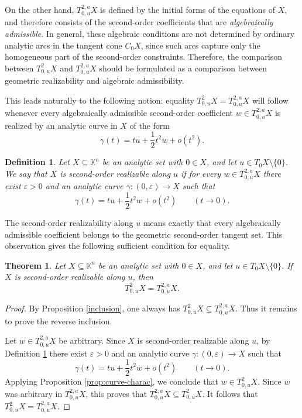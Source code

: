 \documentclass[10pt,reqno]{amsart}
\theoremstyle{break-italic}
\theoremstyle{break-italic}
\theoremstyle{break-italic}
\theoremstyle{break-italic}
\theoremstyle{break-italic}
\theoremstyle{break-italic}
\theoremstyle{break-italic}
\theoremstyle{break-italic}
\newtheorem{theorem}[satz]{Theorem}
\theoremstyle{break-roman}
\newtheorem{definition}[satz]{Definition}
\theoremstyle{standard}
\theoremstyle{varthm-roman}
\theoremstyle{varthm-italic}
\theoremstyle{varthm-roman-break}
\theoremstyle{varthm-italic-break}
\theoremstyle{varthm-roman-no-punctuation}
\theoremstyle{varthm-italic-no-punctuation}
\numberwithin{equation}{section}
\begin{document}
On the other hand, $T^{2,a}_{0,u}X$ is defined by the initial forms of the equations
of $X$, and therefore consists of the second-order coefficients that are
\emph{algebraically admissible}. In general, these algebraic conditions are not
determined by ordinary analytic arcs in the tangent cone $C_0X$, since such arcs
capture only the homogeneous part of the second-order constraints. Therefore,
the comparison between $T^2_{0,u}X$ and $T^{2,a}_{0,u}X$ should be formulated as
a comparison between geometric realizability and algebraic admissibility.

This leads naturally to the following notion: equality
\(
T^2_{0,u}X = T^{2,a}_{0,u}X
\)
will follow whenever every algebraically admissible second-order coefficient
$w\in T^{2,a}_{0,u}X$ is realized by an analytic curve in $X$ of the form
\[
\gamma(t)=tu+\frac12 t^2w+o(t^2).
\]


\begin{definition}\label{def:realizability}
Let $X\subseteq \mathbb K^n$ be an analytic set with $0\in X$, and let
$u\in T_0X\setminus\{0\}$. We say that $X$ is \emph{second-order realizable
along $u$} if for every $w\in T^{2,a}_{0,u}X$ there exist $\varepsilon>0$ and
an analytic curve
\(
\gamma:(0,\varepsilon)\to X
\)
such that
\[
\gamma(t)=tu+\frac12 t^2w+o(t^2)
\qquad (t\to 0).
\]
\end{definition}

The second-order realizability along $u$ means exactly that every
algebraically admissible coefficient belongs to the geometric second-order
tangent set. This observation gives the following sufficient condition for equality.

\begin{theorem}\label{thm:realizability-equality}
Let $X\subseteq \mathbb K^n$ be an analytic set with $0\in X$, and let
$u\in T_0X\setminus\{0\}$. If $X$ is second-order realizable along $u$, then
\[
T^2_{0,u}X=T^{2,a}_{0,u}X.
\]
\end{theorem}

\begin{proof}
By Proposition \ref{inclusion}, one always has
\(
T^2_{0,u}X\subseteq T^{2,a}_{0,u}X.
\)
Thus it remains to prove the reverse inclusion. 

Let $w\in T^{2,a}_{0,u}X$ be arbitrary. Since $X$ is second-order realizable
along $u$, by Definition \ref{def:realizability} there exist $\varepsilon>0$
and an analytic curve
\(
\gamma:(0,\varepsilon)\to X
\)
such that
\[
\gamma(t)=tu+\frac12 t^2w+o(t^2)
\qquad (t\to 0).
\]
Applying Proposition \ref{prop:curve-charac}, we conclude that
\(
w\in T^2_{0,u}X.
\)
Since $w$ was arbitrary in $T^{2,a}_{0,u}X$, this proves that
\(
T^{2,a}_{0,u}X\subseteq T^2_{0,u}X.
\)
It follows that
\(
T^2_{0,u}X=T^{2,a}_{0,u}X.
\)
\end{proof}
\end{document}

